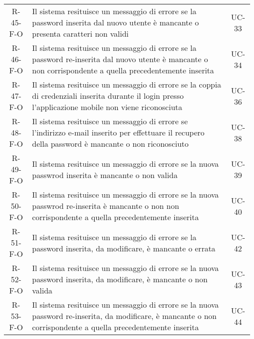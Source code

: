 \begin{longtable}{ c C{9.5cm} c }
    R-45-F-O & Il sistema resituisce un messaggio di errore se la password inserita dal nuovo utente è mancante o presenta caratteri non validi& UC-33\\
    R-46-F-O & Il sistema resituisce un messaggio di errore se la password re-inserita dal nuovo utente è mancante o non corrispondente a quella precedentemente inserita& UC-34\\
    R-47-F-O & Il sistema resituisce un messaggio di errore se la coppia di credenziali inserita durante il login presso l'applicazione mobile non viene riconosciuta& UC-36\\
    R-48-F-O & Il sistema resituisce un messaggio di errore se l'indirizzo e-mail inserito per effettuare il recupero della password è mancante o non riconosciuto& UC-38\\
    R-49-F-O & Il sistema resituisce un messaggio di errore se la nuova passwrod inserita è mancante o non valida& UC-39\\
    R-50-F-O & Il sistema resituisce un messaggio di errore se la nuova passwrod re-inserita è mancante o non non corrispondente a quella precedentemente inserita& UC-40\\
    R-51-F-O & Il sistema resituisce un messaggio di errore se la password inserita, da modificare, è mancante o errata& UC-42\\
    R-52-F-O & Il sistema resituisce un messaggio di errore se la nuova password inserita, da modificare, è mancante o non valida& UC-43\\
    R-53-F-O & Il sistema resituisce un messaggio di errore se la nuova password re-inserita, da modificare, è mancante o non corrispondente a quella precedentemente inserita& UC-44\\

\end{longtable}